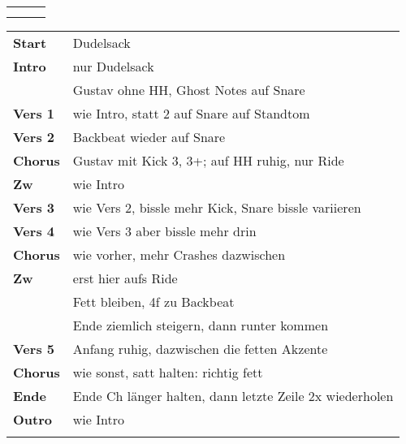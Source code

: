 

\begin{tabular}{p{0.6cm}p{12cm}p{1.4cm}}
	\rowcolor{cyan} \myRow{\thesongnumber} & \myRow{By Faith} & \myRow{76} \\
	                                       &                  &            \\
\end{tabular}

\begin{tabular}{p{1.6cm}l}
	\textbf{Start}  & Dudelsack                                               \\
	\textbf{Intro}  & nur Dudelsack                                           \\
	                & Gustav ohne HH, Ghost Notes auf Snare                   \\
	\textbf{Vers 1} & wie Intro, statt 2 auf Snare auf Standtom               \\
	\textbf{Vers 2} & Backbeat wieder auf Snare                               \\
	\textbf{Chorus} & Gustav mit Kick 3, 3+; auf HH ruhig, nur Ride           \\
	\textbf{Zw}     & wie Intro                                               \\
	\textbf{Vers 3} & wie Vers 2, bissle mehr Kick, Snare bissle variieren    \\
	\textbf{Vers 4} & wie Vers 3 aber bissle mehr drin                        \\
	\textbf{Chorus} & wie vorher, mehr Crashes dazwischen                     \\
	\textbf{Zw}     & erst hier aufs Ride                                     \\
	                & Fett bleiben, 4f zu Backbeat                            \\
	                & Ende ziemlich steigern, dann runter kommen              \\
	\textbf{Vers 5} & Anfang ruhig, dazwischen die fetten Akzente             \\
	\textbf{Chorus} & wie sonst, satt halten: richtig fett                    \\
	\textbf{Ende}   & Ende Ch länger halten, dann letzte Zeile 2x wiederholen \\
	\textbf{Outro}  & wie Intro                                               \\
	                &                                                         \\
\end{tabular}
